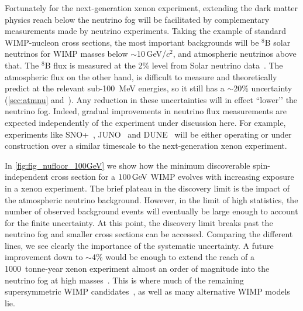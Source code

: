 Fortunately for the next-generation xenon experiment, extending the dark matter physics reach below the neutrino fog will be facilitated by complementary measurements made by neutrino experiments. Taking the example of standard WIMP-nucleon cross sections, the most important backgrounds will be $^8$B solar neutrinos for WIMP masses below $\sim$10\,GeV/$c^2$, and atmospheric neutrinos above that. The $^8$B flux is measured at the 2\% level from Solar neutrino data~\cite{Bergstrom:2016cbh}. The atmospheric flux on the other hand, is difficult to measure and theoretically predict at the relevant sub-100~MeV energies, so it still has a $\sim$20\% uncertainty (\autoref{sec:atmnu} and~\cite{Newstead:2020fie}). Any reduction in these uncertainties will in effect ``lower’’ the neutrino fog. Indeed, gradual improvements in neutrino flux measurements are expected independently of the experiment under discussion here. For example, experiments like SNO+~\cite{Caden:2017htb}, JUNO~\cite{JinpingNeutrinoExperimentgroup:2016nol} and DUNE~\cite{Abi:2018dnh,Kelly:2019itm} will be either operating or under construction over a similar timescale to the next-generation xenon experiment.

In \autoref{fig:fig_nufloor_100GeV} we show how the minimum discoverable spin-independent cross section for a $100\, \mathrm{GeV}$ WIMP evolves with increasing exposure in a xenon experiment. The brief plateau in the discovery limit is the impact of the atmospheric neutrino background. However, in the limit of high statistics, the number of observed background events will eventually be large enough to account for the finite uncertainty. At this point, the discovery limit breaks past the neutrino fog and smaller cross sections can be accessed. Comparing the different lines, we see clearly the importance of the systematic uncertainty. A future improvement down to $\sim$4\% would be enough to extend the reach of a 1000~tonne-year xenon experiment almost an order of magnitude into the neutrino fog at high masses~\cite{OHare:2020lva}. This is where much of the remaining supersymmetric WIMP candidates~\cite{Roszkowski:2014iqa,Athron:2017qdc,Hisano:2011cs,Kobakhidze:2018vuy}, as well as many alternative WIMP models~\cite{Arcadi:2017wqi,Baker:2019ndr,Arina:2019tib} lie.

